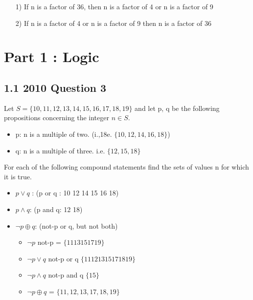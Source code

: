 \documentclass[]{report}
\begin{document}
\begin{itemize}
\item[1)] If n is a factor of 36, then n is a factor of 4 or n is a factor of 9
\item[2)] If n is a factor of 4 or n is a factor of 9 then  n is a factor of 36
\end{itemize}


\newpage

\section*{Part 1 : Logic}


\subsection*{1.1 2010 Question 3}
Let $S = \{10,11,12,13,14,15,16,17,18,19\}$ and let p, q be the following propositions concerning the integer $n \in S$.

\begin{itemize}
\item p: n is a multiple of two. (i.,18e. $\{10,12,14,16,18\}$)
\item q: n is a multiple of three. {i.e. $\{12,15,18\}$}
\end{itemize}

For each of the following compound statements find the sets of values n for which it is true. 

\begin{itemize}
\item $p \vee q$ : (p or q :  10 12 14 15 16 18) 
\item $p \wedge q$: (p and q: 12 18)
\item $ \neg p \oplus q$: (not-p or q, but not both)
\begin{itemize}
\item $\neg p $ not-p = $\{ 11 13 15 17 19\}$
\item $\neg p \vee q$ not-p or q $\{11 12 13 15 17 18 19\}$
\item $\neg p \wedge q$ not-p and q $\{15\} $
\item $ \neg p \oplus q$ = $\{11, 12, 13, 17, 18, 19\}$
\end{itemize}
\end{itemize}


\end{document}
